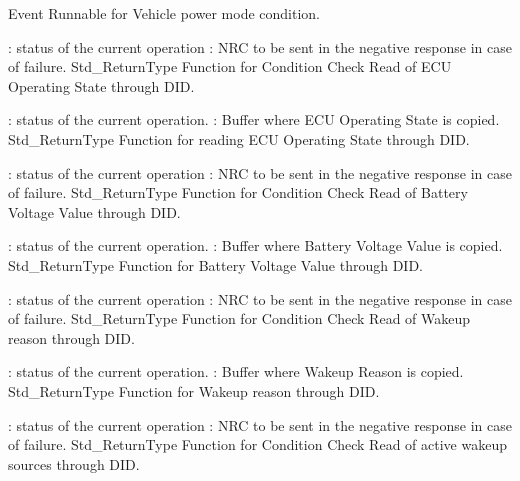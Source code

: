 {
{Event}
{}{}{}{}
{}
{Runnable for Vehicle power mode condition.}
}
{}

{
{: status of the current operation}
{: NRC to be sent in the negative response in case of failure.}
{}
{Std_ReturnType}
{Function for Condition Check Read of ECU Operating State through DID.}
}
{}

{
{: status of the current operation.}
{: Buffer where ECU Operating State is copied.}
{}
{Std_ReturnType}
{Function for reading ECU Operating State through DID.}
}
{}

{
{: status of the current operation}
{: NRC to be sent in the negative response in case of failure.}
{}
{Std_ReturnType}
{Function for Condition Check Read of Battery Voltage Value through DID.}
}
{}

{
{: status of the current operation.}
{: Buffer where Battery Voltage Value is copied.}
{}
{Std_ReturnType}
{Function for Battery Voltage Value through DID.}
}
{}

{
{: status of the current operation}
{: NRC to be sent in the negative response in case of failure.}
{}
{Std_ReturnType}
{Function for Condition Check Read of Wakeup reason through DID.}
}
{}

{
{: status of the current operation.}
{: Buffer where Wakeup Reason is copied.}
{}
{Std_ReturnType}
{Function for Wakeup reason through DID.}
}
{ }

{
{: status of the current operation}
{: NRC to be sent in the negative response in case of failure.}
{}
{Std_ReturnType}
{Function for Condition Check Read of active wakeup sources through DID.}
}
{}

